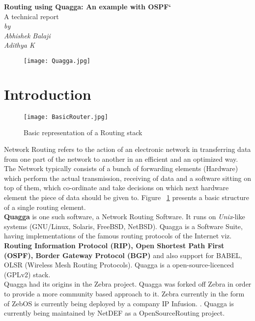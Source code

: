 \documentclass{article}
\begin{document}
\begin{titlepage}
\begin{center}
    \Large\textbf{Routing using Quagga: An example with OSPF`}\\
    A technical report\\
    \textit{by}\\
    \large\textit{Abhishek Balaji \\ Adithya K}
\end{center}
\vspace{2cm}
\begin{figure}[ht!]
  \centering
  \texttt{[image: Quagga.jpg]}
\end{figure}

\end{titlepage}
\tableofcontents
\clearpage
\section{Introduction}
\begin{figure}[ht!]
  \centering
  \texttt{[image: BasicRouter.jpg]}
  \caption{Basic representation of a Routing stack}
  \label{fig:basicrouter}
\end{figure}
Network Routing refers to the action of an electronic network in transferring data 
from one part of the network to another in an efficient and an optimized way. 
The Network typically consists of a bunch of forwarding elements (Hardware) which 
perform the actual transmission, receiving of data and a software sitting on top of them, 
which co-ordinate and take decisions on which next hardware element the piece of data 
should be given to. Figure~ \ref{fig:basicrouter} presents a basic structure 
of a single routing element.\\
\textbf{Quagga} is one such software, a Network Routing Software. It runs on \textit{Unix}-like systems 
(GNU/Linux, Solaris, FreeBSD, NetBSD). Quagga is a Software Suite, having implementations 
of the famous routing protocols of the Internet viz. \textbf{Routing Information Protocol (RIP), 
Open Shortest Path First (OSPF), Border Gateway Protocol (BGP)} and also support for 
BABEL, OLSR (Wireless Mesh Routing Protocols). Quagga is a open-source-licenced (GPLv2) stack.\\
Quagga had its origins in the Zebra project. Quagga was forked off Zebra in order to provide a
more community based approach to it. Zebra currently in the form of ZebOS is currently being
deployed by a company IP Infusion. \cite{zebraipinfusion}. Quagga is currently being maintained
by NetDEF \cite{netdef} as a OpenSourceRouting project.
\end{document}

